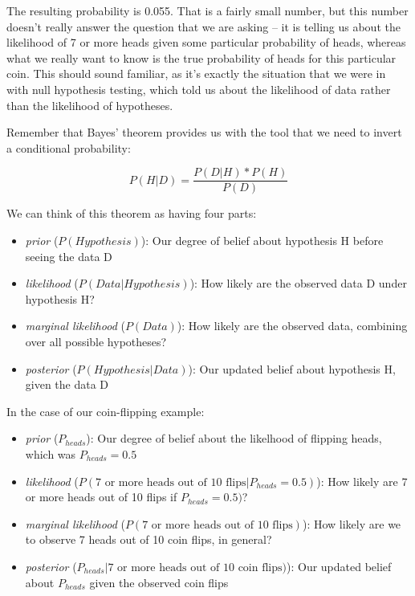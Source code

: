 \documentclass[12pt,]{book}
\providecommand{\tightlist}{%
  \setlength{\itemsep}{0pt}\setlength{\parskip}{0pt}}
\theoremstyle{definition}
\theoremstyle{definition}
\theoremstyle{definition}
\theoremstyle{remark}
\begin{document}
The resulting probability is 0.055. That is a fairly small number, but this number doesn't really answer the question that we are asking -- it is telling us about the likelihood of 7 or more heads given some particular probability of heads, whereas what we really want to know is the true probability of heads for this particular coin. This should sound familiar, as it's exactly the situation that we were in with null hypothesis testing, which told us about the likelihood of data rather than the likelihood of hypotheses.

Remember that Bayes' theorem provides us with the tool that we need to invert a conditional probability:

\[
P(H|D) = \frac{P(D|H)*P(H)}{P(D)}
\]

We can think of this theorem as having four parts:

\begin{itemize}
\tightlist
\item
  \emph{prior} (\(P(Hypothesis)\)): Our degree of belief about hypothesis H before seeing the data D
\item
  \emph{likelihood} (\(P(Data|Hypothesis)\)): How likely are the observed data D under hypothesis H?
\item
  \emph{marginal likelihood} (\(P(Data)\)): How likely are the observed data, combining over all possible hypotheses?
\item
  \emph{posterior} (\(P(Hypothesis|Data)\)): Our updated belief about hypothesis H, given the data D
\end{itemize}

In the case of our coin-flipping example:

\begin{itemize}
\tightlist
\item
  \emph{prior} (\(P_{heads}\)): Our degree of belief about the likelhood of flipping heads, which was \(P_{heads}=0.5\)
\item
  \emph{likelihood} (\(P(\text{7 or more heads out of 10 flips}|P_{heads}=0.5)\)): How likely are 7 or more heads out of 10 flips if \(P_{heads}=0.5)\)?
\item
  \emph{marginal likelihood} (\(P(\text{7 or more heads out of 10 flips})\)): How likely are we to observe 7 heads out of 10 coin flips, in general?
\item
  \emph{posterior} (\(P_{heads}|\text{7 or more heads out of 10 coin flips})\)): Our updated belief about \(P_{heads}\) given the observed coin flips
\end{itemize}
\end{document}

